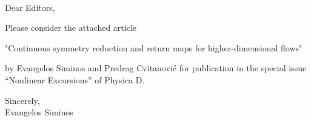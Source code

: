 \documentclass[12pt]{letter}
\begin{document}
\begin{letter}{
\\

}


\opening{Dear Editors,}

Please consider the attached article

"Continuous symmetry reduction and return maps for higher-dimensional flows"

by Evangelos Siminos and Predrag Cvitanovi\'c for publication in the special
issue ``Nonlinear Excursions'' of Physica D.

\closing{Sincerely,\\ Evangelos Siminos}


\end{letter}
\end{document}
